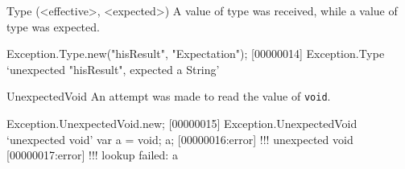 \begin{urbiscriptapi}
\item[Type](<effective>, <expected>)
  A value of type  was received, while a value of type
   was expected.
\begin{urbiscript}
Exception.Type.new("hisResult", "Expectation");
[00000014] Exception.Type `unexpected "hisResult", expected a String'
\end{urbiscript}

\item[UnexpectedVoid] An attempt was made to read the value of
  \lstinline|void|.
\begin{urbiscript}
Exception.UnexpectedVoid.new;
[00000015] Exception.UnexpectedVoid `unexpected void'
var a = void;
a;
[00000016:error] !!! unexpected void
[00000017:error] !!! lookup failed: a
\end{urbiscript}

\end{urbiscriptapi}


